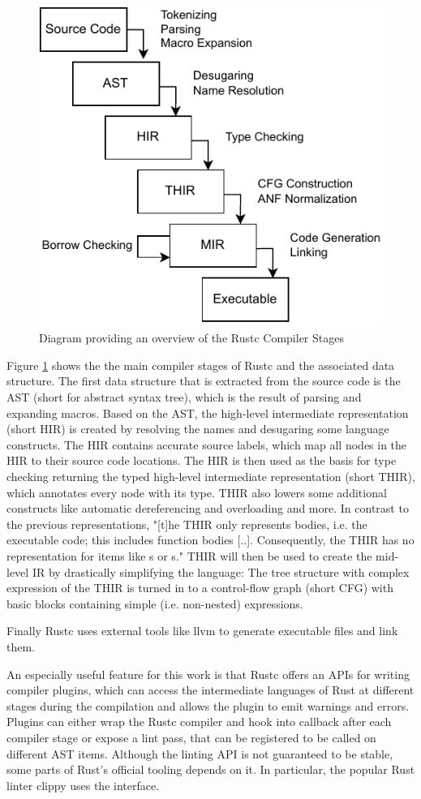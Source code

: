 \documentclass[twoside, english]{sdqthesis}
\theoremstyle{definition}
\begin{document}
\begin{figure}[h]
	\centering
	\includegraphics[width=0.6\linewidth]{./rustc-stages.pdf}
	\caption{Diagram providing an overview of the Rustc Compiler Stages}
	\label{fig:rust-stages}
\end{figure}

Figure \ref{fig:rust-stages} shows the the main compiler stages of Rustc and the associated data structure. The first data structure that is extracted from the source code is the AST (short for abstract syntax tree), which is the result of parsing and expanding macros. 
Based on the AST, the high-level intermediate representation (short HIR) is created by resolving the names and desugaring some language constructs. The HIR contains accurate source labels, which map all nodes in the HIR to their source code locations. 
The HIR is then used as the basis for type checking returning the typed high-level intermediate representation (short THIR), which annotates every node with its type. THIR also lowers some additional constructs like automatic dereferencing and overloading and more. In contrast to the previous representations, "[t]he THIR only represents bodies, i.e. the executable code; this includes function bodies [..]. Consequently, the THIR has no representation for items like s or s." \cite[p. 1]{noauthor_thir_nodate}
THIR will then be used to create the mid-level IR by drastically simplifying the language: The tree structure with complex expression of the THIR is turned in to a control-flow graph (short CFG) with basic blocks containing simple (i.e. non-nested) expressions.

Finally Rustc uses external tools \- like llvm \- to generate executable files and link them.

An especially useful feature for this work is that Rustc offers an APIs for writing compiler plugins, which can access the intermediate languages of Rust at different stages during the compilation and allows the plugin to emit warnings and errors. 
Plugins can either wrap the Rustc compiler and hook into callback after each compiler stage or expose a lint pass, that can be registered to be called on different AST items.
Although the linting API is not guaranteed to be stable, some parts of Rust's official tooling depends on it. In particular, the popular Rust linter clippy uses the interface.
\end{document}
